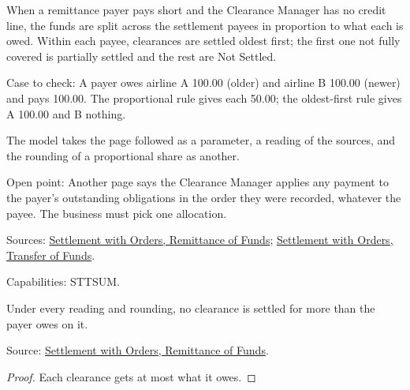 \begin{definition}
  \label{def:accounting-short-remittance-allocation}
  When a remittance payer pays short and the Clearance Manager has no credit
  line, the funds are split across the settlement payees in proportion to
  what each is owed. Within each payee, clearances are settled oldest first;
  the first one not fully covered is partially settled and the rest are Not
  Settled.

  Case to check: A payer owes airline A 100.00 (older) and airline B 100.00
  (newer) and pays 100.00. The proportional rule gives each 50.00; the
  oldest-first rule gives A 100.00 and B nothing.

  The model takes the page followed as a parameter, a reading of the
  sources, and the rounding of a proportional share as another.

  Open point: Another page says the Clearance Manager applies any payment to
  the payer's outstanding obligations in the order they were recorded,
  whatever the payee. The business must pick one allocation.

  Sources: \href{https://standards.atlassian.net/wiki/spaces/SWO/pages/574718145}{Settlement with Orders, Remittance of Funds};
  \href{https://standards.atlassian.net/wiki/spaces/SWO/pages/574488849}{Settlement with Orders, Transfer of Funds}.

  Capabilities: STTSUM.
\end{definition}

\begin{theorem}
  \label{thm:accounting-allocation-within-owed}
  Under every reading and rounding, no clearance is settled for more than
  the payer owes on it.

  Source: \href{https://standards.atlassian.net/wiki/spaces/SWO/pages/574718145}{Settlement with Orders, Remittance of Funds}.
\end{theorem}
\begin{proof}
  Each clearance gets at most what it owes.
\end{proof}

